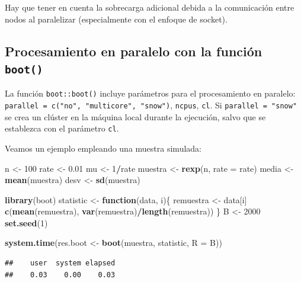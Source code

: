 \documentclass[
]{book}
\newenvironment{Shaded}{\begin{snugshade}}{\end{snugshade}}
\newcommand{\AttributeTok}[1]{\textcolor[rgb]{0.13,0.29,0.53}{#1}}
\newcommand{\ControlFlowTok}[1]{\textcolor[rgb]{0.13,0.29,0.53}{\textbf{#1}}}
\newcommand{\DecValTok}[1]{\textcolor[rgb]{0.00,0.00,0.81}{#1}}
\newcommand{\FloatTok}[1]{\textcolor[rgb]{0.00,0.00,0.81}{#1}}
\newcommand{\FunctionTok}[1]{\textcolor[rgb]{0.13,0.29,0.53}{\textbf{#1}}}
\newcommand{\NormalTok}[1]{#1}
\newcommand{\OtherTok}[1]{\textcolor[rgb]{0.56,0.35,0.01}{#1}}
\newcommand{\SpecialCharTok}[1]{\textcolor[rgb]{0.81,0.36,0.00}{\textbf{#1}}}
\theoremstyle{break}
\theoremstyle{nonumberplain}
\begin{document}
Hay que tener en cuenta la sobrecarga adicional debida a la comunicación entre nodos
al paralelizar (especialmente con el enfoque de socket).

\subsection{\texorpdfstring{Procesamiento en paralelo con la función \texttt{boot()}}{Procesamiento en paralelo con la función boot()}}\label{procesamiento-en-paralelo-con-la-funciuxf3n-boot}

La función \texttt{boot::boot()} incluye parámetros para el procesamiento en paralelo:
\texttt{parallel\ =\ c("no",\ "multicore",\ "snow")}, \texttt{ncpus}, \texttt{cl}.
Si \texttt{parallel\ =\ "snow"} se crea un clúster en la máquina local durante la ejecución,
salvo que se establezca con el parámetro \texttt{cl}.

Veamos un ejemplo empleando una muestra simulada:

\begin{Shaded}
\begin{Highlighting}[]
\NormalTok{n }\OtherTok{\textless{}{-}} \DecValTok{100}
\NormalTok{rate }\OtherTok{\textless{}{-}} \FloatTok{0.01}
\NormalTok{mu }\OtherTok{\textless{}{-}} \DecValTok{1}\SpecialCharTok{/}\NormalTok{rate}
\NormalTok{muestra }\OtherTok{\textless{}{-}} \FunctionTok{rexp}\NormalTok{(n, }\AttributeTok{rate =}\NormalTok{ rate)}
\NormalTok{media }\OtherTok{\textless{}{-}} \FunctionTok{mean}\NormalTok{(muestra)}
\NormalTok{desv }\OtherTok{\textless{}{-}} \FunctionTok{sd}\NormalTok{(muestra)}

\FunctionTok{library}\NormalTok{(boot)}
\NormalTok{statistic }\OtherTok{\textless{}{-}} \ControlFlowTok{function}\NormalTok{(data, i)\{}
\NormalTok{  remuestra }\OtherTok{\textless{}{-}}\NormalTok{ data[i]}
  \FunctionTok{c}\NormalTok{(}\FunctionTok{mean}\NormalTok{(remuestra), }\FunctionTok{var}\NormalTok{(remuestra)}\SpecialCharTok{/}\FunctionTok{length}\NormalTok{(remuestra))}
\NormalTok{\}}
\NormalTok{B }\OtherTok{\textless{}{-}} \DecValTok{2000}
\FunctionTok{set.seed}\NormalTok{(}\DecValTok{1}\NormalTok{)}

\FunctionTok{system.time}\NormalTok{(res.boot }\OtherTok{\textless{}{-}} \FunctionTok{boot}\NormalTok{(muestra, statistic, }\AttributeTok{R =}\NormalTok{ B))}
\end{Highlighting}
\end{Shaded}

\begin{verbatim}
##    user  system elapsed 
##    0.03    0.00    0.03
\end{verbatim}
\end{document}
